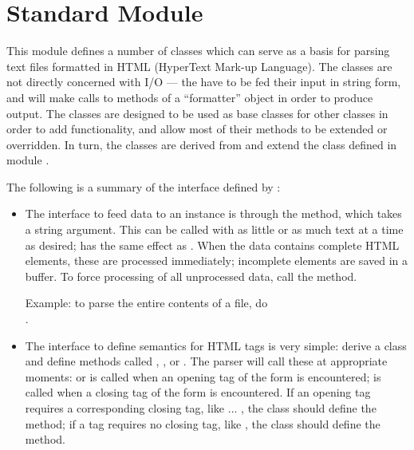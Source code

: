 \section{Standard Module }

\renewcommand{\indexsubitem}{(in module htmllib)}

This module defines a number of classes which can serve as a basis for
parsing text files formatted in HTML (HyperText Mark-up Language).
The classes are not directly concerned with I/O --- the have to be fed
their input in string form, and will make calls to methods of a
``formatter'' object in order to produce output.  The classes are
designed to be used as base classes for other classes in order to add
functionality, and allow most of their methods to be extended or
overridden.  In turn, the classes are derived from and extend the
class  defined in module .

The following is a summary of the interface defined by
:

\begin{itemize}

\item
The interface to feed data to an instance is through the 
method, which takes a string argument.  This can be called with as
little or as much text at a time as desired;
 has the same effect as .
When the data contains complete
HTML elements, these are processed immediately; incomplete elements
are saved in a buffer.  To force processing of all unprocessed data,
call the  method.

Example: to parse the entire contents of a file, do\\
.

\item
The interface to define semantics for HTML tags is very simple: derive
a class and define methods called ,
, or .  The parser will
call these at appropriate moments:  or
 is called when an opening tag of the form
 is encountered;  is called
when a closing tag of the form  is encountered.  If
an opening tag requires a corresponding closing tag, like 
... , the class should define the 
method; if a tag requires no closing tag, like , the class
should define the  method.

\end{itemize}

